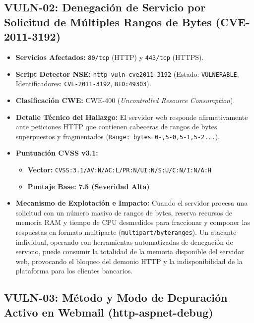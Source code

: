 \subsection{VULN-02: Denegación de Servicio por Solicitud de Múltiples Rangos de Bytes (CVE-2011-3192)}

\begin{itemize}
  \item \textbf{Servicios Afectados:} \texttt{80/tcp} (HTTP) y \texttt{443/tcp} (HTTPS).
  \item \textbf{Script Detector NSE:} \texttt{http-vuln-cve2011-3192} (Estado: \texttt{VULNERABLE}, Identificadores: \texttt{CVE-2011-3192}, \texttt{BID:49303}).
  \item \textbf{Clasificación CWE:} CWE-400 (\textit{Uncontrolled Resource Consumption}).
  \item \textbf{Detalle Técnico del Hallazgo:} El servidor web responde afirmativamente ante peticiones HTTP que contienen cabeceras de rangos de bytes superpuestos y fragmentados (\texttt{Range: bytes=0-,5-0,5-1,5-2...}).
  \item \textbf{Puntuación CVSS v3.1:}
    \begin{itemize}
      \item \textbf{Vector:} \texttt{CVSS:3.1/AV:N/AC:L/PR:N/UI:N/S:U/C:N/I:N/A:H}
      \item \textbf{Puntaje Base:} \textbf{7.5 (Severidad Alta)}
    \end{itemize}
  \item \textbf{Mecanismo de Explotación e Impacto:} Cuando el servidor procesa una solicitud con un número masivo de rangos de bytes, reserva recursos de memoria RAM y tiempo de CPU desmedidos para fraccionar y componer las respuestas en formato multiparte (\texttt{multipart/byteranges}). Un atacante individual, operando con herramientas automatizadas de denegación de servicio, puede consumir la totalidad de la memoria disponible del servidor web, provocando el bloqueo del demonio HTTP y la indisponibilidad de la plataforma para los clientes bancarios.
\end{itemize}

\subsection{VULN-03: Método y Modo de Depuración Activo en Webmail (http-aspnet-debug)}

